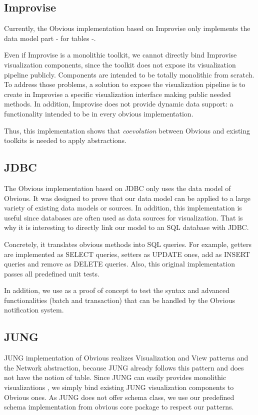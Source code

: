 \subsection{Improvise}

Currently, the Obvious implementation based on Improvise only implements the data model part - for tables -.

Even if Improvise is a monolithic toolkit, we cannot directly bind Improvise visualization components, since the toolkit does not expose its visualization pipeline publicly. Components are intended to be totally monolithic from scratch. To address those problems, a solution to expose the visualization pipeline is to create in Improvise a specific visualization interface making public needed methods. In addition, Improvise does not provide dynamic data support: a functionality intended to be in every obvious implementation.

Thus, this implementation shows that \emph{coevolution} between Obvious and existing toolkits is needed to apply abstractions.

\subsection{JDBC}

The Obvious implementation based on JDBC only uses the data model of Obvious. It was designed to prove that our data model can be applied to a large variety of existing data models or sources. In addition, this implementation is useful since databases are often used as data sources for visualization. That is why it is interesting to directly link our model to an SQL database with JDBC.

Concretely, it  translates obvious methods into SQL queries. For example, getters are implemented as SELECT queries, setters as UPDATE ones, add as INSERT queries and remove as DELETE queries. Also, this original implementation passes all predefined unit tests.

In addition, we use as a proof of concept to test the syntax and advanced functionalities (batch and transaction) that can be handled by the Obvious notification system.

\subsection{JUNG}

JUNG implementation of Obvious realizes Visualization and View patterns and the Network abstraction, because JUNG already follows this pattern and does not have the notion of table. Since JUNG can easily provides monolithic visualizations , we simply bind existing JUNG visualization components to Obvious ones. As JUNG does not offer schema class, we use our predefined schema implementation from obvious core package to respect our patterns.


